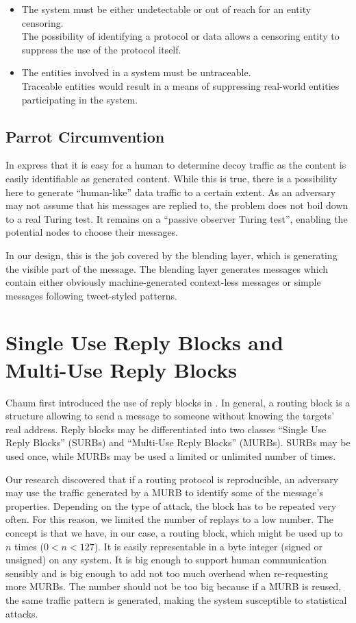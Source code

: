 \begin{itemize}
	\item The system must be either undetectable or out of reach for an entity censoring.\\
	The possibility of identifying a protocol or data allows a censoring entity to suppress the use of the protocol itself. 
	\item The entities involved in a system must be untraceable.\\
	Traceable entities would result in a means of suppressing real-world entities participating in the system.
\end{itemize}

\subsection{Parrot Circumvention}
In \cite{oakland2013-parrot} \citeauthor{oakland2013-parrot} express that it is easy for a human to determine decoy traffic as the content is easily identifiable as generated content. While this is true, there is a possibility here to generate ``human-like'' data traffic to a certain extent. As an adversary may not assume that his messages are replied to, the problem does not boil down to a real Turing test. It remains on a ``passive observer Turing test'', enabling the potential nodes to choose their messages. 

In our design, this is the job covered by the blending layer, which is generating the visible part of the message. The blending layer generates messages which contain either obviously machine-generated context-less messages or simple messages following tweet-styled patterns. 

\section{Single Use Reply Blocks and Multi-Use Reply Blocks}
Chaum first introduced the use of reply blocks in \cite{CHAUM1}. In general, a routing block is a structure allowing to send a message to someone without knowing the targets' real address. Reply blocks may be differentiated into two classes ``Single Use Reply Blocks'' (SURBs)  and ``Multi-Use Reply Blocks'' (MURBs). SURBs may be used once, while MURBs may be used a limited or unlimited number of times. 

Our research discovered that if a routing protocol is reproducible, an adversary may use the traffic generated by a MURB to identify some of the message's properties. Depending on the type of attack, the block has to be repeated very often. For this reason, we limited the number of replays to a low number. The concept is that we have, in our case, a routing block, which might be used up to $n$ times ($0<n<127$). It is easily representable in a byte integer (signed or unsigned) on any system. It is big enough to support human communication sensibly and is big enough to add not too much overhead when re-requesting more MURBs. The number should not be too big because if a MURB is reused, the same traffic pattern is generated, making the system susceptible to statistical attacks.

